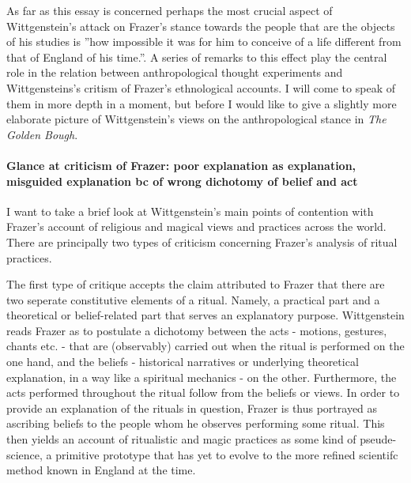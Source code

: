 \documentclass{article}
\begin{document}
As far as this essay is concerned perhaps the most crucial aspect of Wittgenstein's attack on Frazer's stance towards the people that are the objects of his studies is ''how impossible it was for him to conceive of a life different from that of England of his time.''. A series of remarks to this effect play the central role in the relation between anthropological thought experiments and Wittgensteins's critism of Frazer's ethnological accounts. I will come to speak of them in more depth in a moment, but before I would like to give a slightly more elaborate picture of Wittgenstein's views on the anthropological stance in \textit{The Golden Bough}.
 
\paragraph{Glance at criticism of Frazer: poor explanation as explanation, misguided explanation bc of wrong dichotomy of belief and act}
I want to take a brief look at Wittgenstein's main points of contention with Frazer's account of religious and magical views and practices across the world. There are principally two types of criticism concerning Frazer's analysis of ritual practices. 

The first type of critique accepts the claim attributed to Frazer that there are two seperate constitutive elements of a ritual. Namely, a practical part and a theoretical or belief-related part that serves an explanatory purpose. Wittgenstein reads Frazer as to postulate a dichotomy between the acts - motions, gestures, chants etc. - that are (observably) carried out when the ritual is performed on the one hand, and the beliefs - historical narratives or underlying theoretical explanation, in a way like a spiritual mechanics - on the other. Furthermore, the acts performed throughout the ritual follow from the beliefs or views. In order to provide an explanation of the rituals in question, Frazer is thus portrayed as ascribing beliefs to the people whom he observes performing some ritual. This then yields an account of ritualistic and magic practices as some kind of pseude-science, a primitive prototype that has yet to evolve to the more refined scientifc method known in England at the time. 
\end{document}
